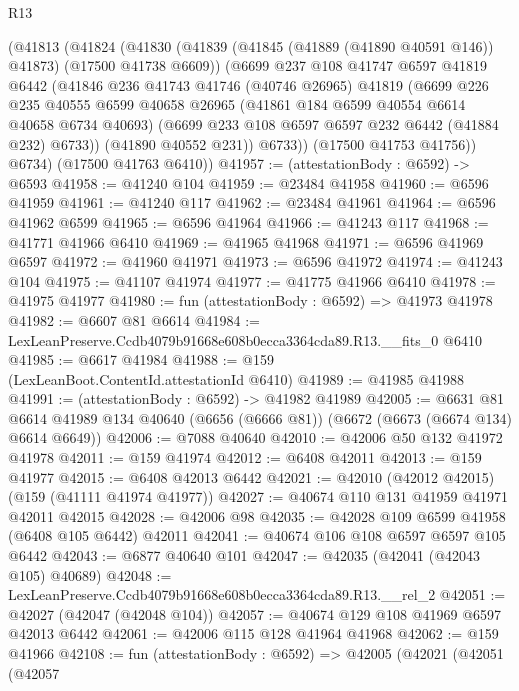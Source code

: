 \begin{lexlean}{R13}
\begin{coremodule}
      (@41813
        (@41824
          (@41830
            (@41839 (@41845 (@41889 (@41890 @40591 @146)) @41873) (@17500 @41738 @6609))
            (@6699
              @237
              @108
              @41747
              @6597
              @41819
              @6442
              (@41846
                @236
                @41743
                @41746
                (@40746 @26965)
                @41819
                (@6699
                  @226
                  @235
                  @40555
                  @6599
                  @40658
                  @26965
                  (@41861 @184 @6599 @40554 @6614 @40658 @6734 @40693)
                  (@6699 @233 @108 @6597 @6597 @232 @6442 (@41884 @232) @6733))
                (@41890 @40552 @231))
              @6733))
          (@17500 @41753 @41756))
        @6734)
      (@17500 @41763 @6410))
@41957 := (attestationBody : @6592) -> @6593
@41958 := @41240 @104
@41959 := @23484 @41958
@41960 := @6596 @41959
@41961 := @41240 @117
@41962 := @23484 @41961
@41964 := @6596 @41962 @6599
@41965 := @6596 @41964
@41966 := @41243 @117
@41968 := @41771 @41966 @6410
@41969 := @41965 @41968
@41971 := @6596 @41969 @6597
@41972 := @41960 @41971
@41973 := @6596 @41972
@41974 := @41243 @104
@41975 := @41107 @41974
@41977 := @41775 @41966 @6410
@41978 := @41975 @41977
@41980 := fun (attestationBody : @6592) => @41973 @41978
@41982 := @6607 @81 @6614
@41984 := LexLeanPreserve.Ccdb4079b91668e608b0ecca3364cda89.R13.__fits_0 @6410
@41985 := @6617 @41984
@41988 := @159 (LexLeanBoot.ContentId.attestationId @6410)
@41989 := @41985 @41988
@41991 := (attestationBody : @6592) -> @41982 @41989
@42005 := @6631
    @81
    @6614
    @41989
    @134
    @40640
    (@6656 (@6666 @81))
    (@6672 (@6673 (@6674 @134) @6614 @6649))
@42006 := @7088 @40640
@42010 := @42006 @50 @132 @41972 @41978
@42011 := @159 @41974
@42012 := @6408 @42011
@42013 := @159 @41977
@42015 := @6408 @42013 @6442
@42021 := @42010 (@42012 @42015) (@159 (@41111 @41974 @41977))
@42027 := @40674 @110 @131 @41959 @41971 @42011 @42015
@42028 := @42006 @98
@42035 := @42028 @109 @6599 @41958 (@6408 @105 @6442) @42011
@42041 := @40674 @106 @108 @6597 @6597 @105 @6442
@42043 := @6877 @40640 @101
@42047 := @42035 (@42041 (@42043 @105) @40689)
@42048 := LexLeanPreserve.Ccdb4079b91668e608b0ecca3364cda89.R13.__rel_2
@42051 := @42027 (@42047 (@42048 @104))
@42057 := @40674 @129 @108 @41969 @6597 @42013 @6442
@42061 := @42006 @115 @128 @41964 @41968
@42062 := @159 @41966
@42108 := fun (attestationBody : @6592) =>
  @42005
    (@42021
      (@42051
        (@42057

\end{coremodule}
\end{lexlean}
